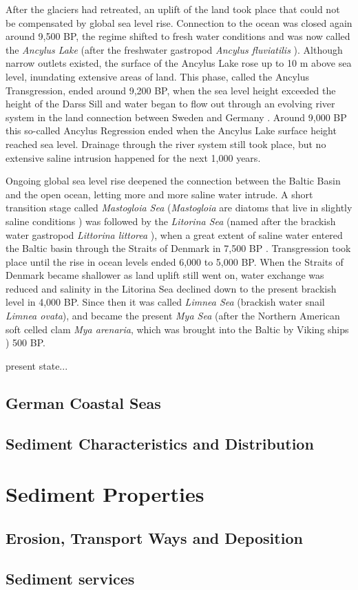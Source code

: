 After the glaciers had retreated, an uplift of the land took place that could not be compensated by global sea level rise. Connection to the ocean was closed again around 9,500 BP, the regime shifted to fresh water conditions and was now called the \textit{Ancylus Lake} (after the freshwater gastropod \textit{Ancylus fluviatilis} \citep[][]{tikkanen2002}). Although narrow outlets existed, the surface of the Ancylus Lake rose up to 10 m above sea level, inundating extensive areas of land. This phase, called the Ancylus Transgression, ended around 9,200 BP, when the sea level height exceeded the height of the Darss Sill and water began to flow out through an evolving river system in the land connection between Sweden and Germany \citep[][]{tikkanen2002}. Around 9,000 BP this so-called Ancylus Regression ended when the Ancylus Lake surface height reached sea level. Drainage through the river system still took place, but no extensive saline intrusion happened for the next 1,000 years.

Ongoing global sea level rise deepened the connection between the Baltic Basin and the open ocean, letting more and more saline water intrude. A short transition stage called \textit{Mastogloia Sea} (\textit{Mastogloia} are diatoms that live in slightly saline conditions \citep[][]{eronen2001}) was followed by the \textit{Litorina Sea} (named after the brackish water gastropod \textit{Littorina littorea} \citep[][]{eronen2001}), when a great extent of saline water entered the Baltic basin through the Straits of Denmark in 7,500 BP \citep[][]{bjoerk95}. Transgression took place until the rise in ocean levels ended 6,000 to 5,000 BP. When the Straits of Denmark became shallower as land uplift still went on, water exchange was reduced and salinity in the Litorina Sea declined down to the present brackish level in 4,000 BP. Since then it was called \textit{Limnea Sea} (brackish water snail \textit{Limnea ovata}), and became the present \textit{Mya Sea} (after the Northern American soft celled clam \textit{Mya arenaria}, which was brought into the Baltic by Viking ships \citep[][]{bjoerck2008}) 500 BP.

present state...

\subsection{German Coastal Seas}

\subsection{Sediment Characteristics and Distribution}

\section{Sediment Properties}

\subsection{Erosion, Transport Ways and Deposition}

\subsection{Sediment services}
